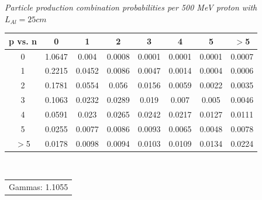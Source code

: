 \documentclass[11pt]{article}
\makeatletter
\newenvironment{tablehere}
{\def\@captype{table}}{}
\makeatother
\begin{document}
\vspace{0.15 cm}
\begin{tablehere}\begin{centering}
  \caption{\small \emph{Particle production combination probabilities per 500 MeV proton with $L_{Al}=25 cm$}}
  \begin{tabular}{c || c c c c c c c}
    p vs. n & 0 & 1 & 2 & 3 & 4 & 5 & $>$5 \\
    \hline\hline
    0 & 1.0647 & 0.004 & 0.0008 & 0.0001 & 0.0001 & 0.0001 & 0.0007 \\
    1 & 0.2215 & 0.0452 & 0.0086 & 0.0047 & 0.0014 & 0.0004 & 0.0006 \\
    2 & 0.1781 & 0.0554 & 0.056 & 0.0156 & 0.0059 & 0.0022 & 0.0035 \\
    3 & 0.1063 & 0.0232 & 0.0289 & 0.019 & 0.007 & 0.005 & 0.0046 \\
    4 & 0.0591 & 0.023 & 0.0265 & 0.0242 & 0.0217 & 0.0127 & 0.0111 \\
    5 & 0.0255 & 0.0077 & 0.0086 & 0.0093 & 0.0065 & 0.0048 & 0.0078 \\
    $>$5 & 0.0178 & 0.0098 & 0.0094 & 0.0103 & 0.0109 & 0.0134 & 0.0224 \\
    \hline\hline
  \end{tabular} \\
  \begin{tabular}{r} Gammas: 1.1055 \\ \end{tabular}  
  \label{tab:production_pAl25}
\end{centering}\end{tablehere}
\vspace{0.15 cm}
\end{document}
